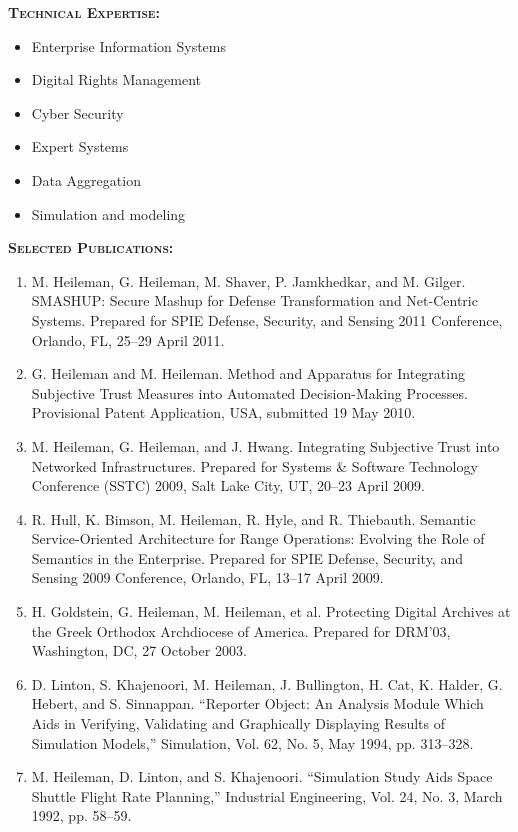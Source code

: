 \documentclass{sbir}
\begin{document}
\vspace{-18pt}
{\textcolor{black}{\makebox[6.5in]{\hrulefill}} 
\textbf{\textsc{Technical Expertise:}}
\vspace{-8pt}
\begin{multicols}{2}
 \begin{itemize}
  \item Enterprise Information Systems
  \item Digital Rights Management
  \item Cyber Security
  \item Expert Systems
  \item Data Aggregation
  \item Simulation and modeling	
 \end{itemize}
\end{multicols}
\vspace{-16pt}
\textbf{\textsc{Selected Publications:}}
\vspace{-8pt}
\begin{enumerate}
\item M. Heileman, G. Heileman, M. Shaver, P. Jamkhedkar, and M. Gilger. SMASHUP: Secure Mashup for Defense Transformation and Net-Centric Systems. Prepared for SPIE Defense, Security, and Sensing 2011 Conference, Orlando, FL, 25--29 April 2011.
\item G. Heileman and M. Heileman. Method and Apparatus for Integrating Subjective Trust Measures into Automated Decision-Making Processes. Provisional Patent Application, USA, submitted 19 May 2010.
\item M. Heileman, G. Heileman, and J. Hwang. Integrating Subjective Trust into Networked Infrastructures. Prepared for Systems \& Software Technology Conference (SSTC) 2009, Salt Lake City, UT, 20--23 April 2009.
\item R. Hull, K. Bimson, M. Heileman, R. Hyle, and R. Thiebauth. Semantic Service-Oriented Architecture for Range Operations: Evolving the Role of Semantics in the Enterprise. Prepared for SPIE Defense, Security, and Sensing 2009 Conference, Orlando, FL, 13--17 April 2009.
\item H. Goldstein, G. Heileman, M. Heileman, et al. Protecting Digital Archives at the Greek Orthodox Archdiocese of America. Prepared for DRM'03, Washington, DC, 27 October 2003.
\item D. Linton, S. Khajenoori, M. Heileman, J. Bullington, H. Cat, K. Halder, G. Hebert, and S. Sinnappan. ``Reporter Object: An Analysis Module Which Aids in Verifying, Validating and Graphically Displaying Results of Simulation Models,'' Simulation, Vol. 62, No. 5, May 1994, pp. 313--328.
\item M. Heileman, D. Linton, and S. Khajenoori. ``Simulation Study Aids Space Shuttle Flight Rate Planning,'' Industrial Engineering, Vol. 24, No. 3, March 1992, pp. 58--59.
\end{enumerate}

}
\end{document}
